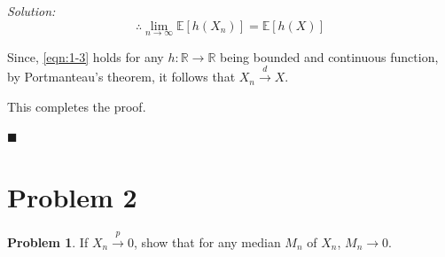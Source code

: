 \documentclass[12pt]{article}
\newcommand{\R}{\mathbb{R}}
\newcommand{\E}{\mathbb{E}}
\theoremstyle{definition}
\newtheorem*{prb}{Problem}
\newenvironment{problem}{\begin{tcolorbox}[colback=blue!5!white,colframe=blue!75!black, parbox = true] \begin{prb}  }{\end{prb}\end{tcolorbox} }
\newenvironment{answer}{\textit{Solution: }\quad }{ \hfill $\blacksquare$}
\numberwithin{equation}{section}
\begin{document}
\begin{answer}
\begin{equation}
    \therefore \lim_{n\rightarrow\infty}\E\left[h(X_n)\right] = \E\left[h(X)\right] 
    \label{eqn:1-3}
\end{equation}

Since, \cref{eqn:1-3} holds for any $h : \R \rightarrow \R$ being bounded and continuous function, by Portmanteau's theorem, it follows that $X_n \xrightarrow{d} X$.

This completes the proof.


\end{answer}

\pagebreak
\section{Problem 2}
\begin{problem}
If $X_n \xrightarrow{p} 0$, show that for any median $M_n$ of $X_n$, $M_n\rightarrow 0$.
\end{problem}
\end{document}
